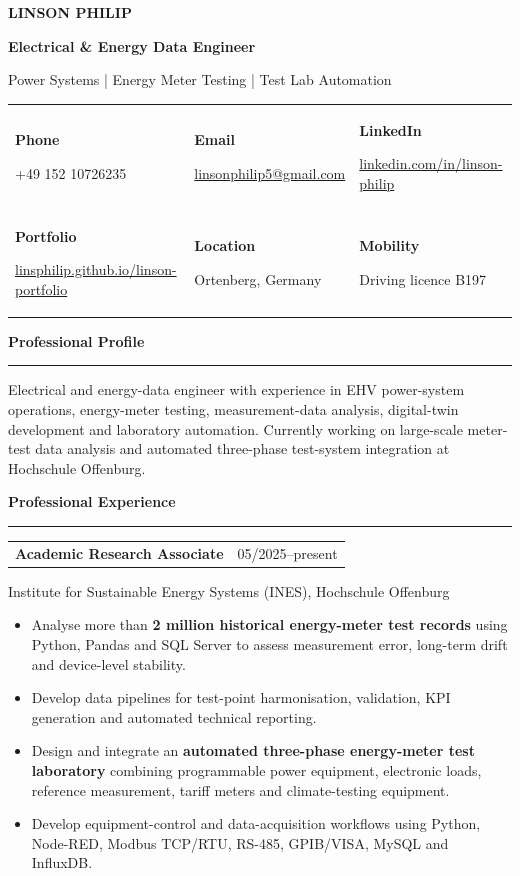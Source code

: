\documentclass[10pt,a4paper]{article}
\makeatletter
\newcommand{\mainheading}[1]{%
  \vspace{7pt}%
  {\fontsize{12.8}{14.2}\selectfont\bfseries\color{ink} #1}\par
  \vspace{1.7pt}\color{line}\rule{\linewidth}{0.55pt}\color{ink}\vspace{4pt}
}
\newcommand{\contactcell}[2]{%
  {\fontsize{7.55}{8.6}\selectfont\bfseries\color{ink} #1}\par
  {\fontsize{7.15}{8.3}\selectfont\color{muted} #2}
}
\newcommand{\experience}[4]{%
  \begin{tabularx}{\linewidth}{@{}X r@{}}
    {\fontsize{9.35}{10.6}\selectfont\bfseries #1} &
    {\fontsize{7.45}{8.6}\selectfont\color{muted} #2}\\[-0.6pt]
  \end{tabularx}
  {\fontsize{8.05}{9.25}\selectfont\color{muted} #3}\par
  \vspace{1.0pt}
  {\fontsize{8.15}{9.35}\selectfont #4}\par
  \vspace{3.0pt}
}
\makeatother
\begin{document}
\hfill
\begin{minipage}[t]{0.655\textwidth}
\vspace{0pt}
{\fontsize{24}{26}\selectfont\bfseries\color{ink} LINSON PHILIP}\par
\vspace{3pt}
{\fontsize{11.2}{12.7}\selectfont\bfseries Electrical \& Energy Data Engineer}\par
\vspace{1.5pt}
{\fontsize{8.5}{9.8}\selectfont\color{accent} Power Systems | Energy Meter Testing | Test Lab Automation}\par
\vspace{6pt}

\begin{tabularx}{\linewidth}{@{}X X X@{}}
\contactcell{Phone}{+49 152 10726235} &
\contactcell{Email}{\href{mailto:linsonphilip5@gmail.com}{linsonphilip5@gmail.com}} &
\contactcell{LinkedIn}{\href{https://www.linkedin.com/in/linson-philip}{linkedin.com/in/linson-philip}}\\[6pt]
\contactcell{Portfolio}{\href{https://linsphilip.github.io/linson-portfolio/}{linsphilip.github.io/linson-portfolio}} &
\contactcell{Location}{Ortenberg, Germany} &
\contactcell{Mobility}{Driving licence B197}\\
\end{tabularx}

\mainheading{Professional Profile}
{\fontsize{8.45}{9.8}\selectfont
Electrical and energy-data engineer with experience in EHV power-system operations, energy-meter testing, measurement-data analysis, digital-twin development and laboratory automation. Currently working on large-scale meter-test data analysis and automated three-phase test-system integration at Hochschule Offenburg.}

\mainheading{Professional Experience}

\experience{Academic Research Associate}{05/2025--present}{Institute for Sustainable Energy Systems (INES), Hochschule Offenburg}{%
\begin{itemize}
  \item Analyse more than \textbf{2 million historical energy-meter test records} using Python, Pandas and SQL Server to assess measurement error, long-term drift and device-level stability.
  \item Develop data pipelines for test-point harmonisation, validation, KPI generation and automated technical reporting.
  \item Design and integrate an \textbf{automated three-phase energy-meter test laboratory} combining programmable power equipment, electronic loads, reference measurement, tariff meters and climate-testing equipment.
  \item Develop equipment-control and data-acquisition workflows using Python, Node-RED, Modbus TCP/RTU, RS-485, GPIB/VISA, MySQL and InfluxDB.
\end{itemize}}


\end{minipage}
\end{document}
